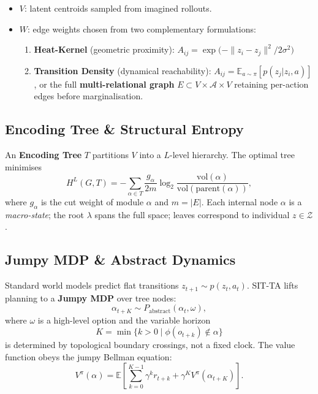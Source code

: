 \documentclass[10pt,twocolumn]{article}
\begin{document}
\begin{itemize}
  \item $V$: latent centroids sampled from imagined rollouts.
  \item $W$: edge weights chosen from two complementary formulations:
    \begin{enumerate}[label=(\arabic*)]
      \item \textbf{Heat-Kernel} (geometric proximity):
        $A_{ij} = \exp\!\bigl(-\|z_i-z_j\|^2/2\sigma^2\bigr)$
      \item \textbf{Transition Density} (dynamical reachability):
        $A_{ij} = \mathbb{E}_{a\sim\pi}[p(z_j|z_i,a)]$,
        or the full \textbf{multi-relational graph}
        $E\!\subset\!V\!\times\!\mathcal{A}\!\times\!V$ retaining
        per-action edges before marginalisation.
    \end{enumerate}
\end{itemize}

\subsection{Encoding Tree \& Structural Entropy}
An \textbf{Encoding Tree} $T$ partitions $V$ into a $L$-level hierarchy.
The optimal tree minimises
\begin{equation}
  H^L(G,T)=-\!\sum_{\alpha\in T}\frac{g_\alpha}{2m}
  \log_2\!\frac{\mathrm{vol}(\alpha)}{\mathrm{vol}(\mathrm{parent}(\alpha))},
\end{equation}
where $g_\alpha$ is the cut weight of module $\alpha$ and $m=|E|$.
Each internal node $\alpha$ is a \emph{macro-state}; the root $\lambda$
spans the full space; leaves correspond to individual $z\in\mathcal{Z}$.

\subsection{Jumpy MDP \& Abstract Dynamics}
Standard world models predict flat transitions $z_{t+1}\!\sim\!p(z_t,a_t)$.
SIT-TA lifts planning to a \textbf{Jumpy MDP} over tree nodes:
\begin{equation}
  \alpha_{t+K}\sim P_{\mathrm{abstract}}(\alpha_t,\omega),
\end{equation}
where $\omega$ is a high-level option and the variable horizon
\begin{equation}
  K=\min\{k>0\mid\phi(o_{t+k})\notin\alpha\}
\end{equation}
is determined by topological boundary crossings, not a fixed clock.
The value function obeys the jumpy Bellman equation:
\begin{equation}
  V^\pi(\alpha)=\mathbb{E}\!\left[\sum_{k=0}^{K-1}\!\gamma^k r_{t+k}
    +\gamma^K V^\pi(\alpha_{t+K})\right].
\end{equation}
\end{document}
